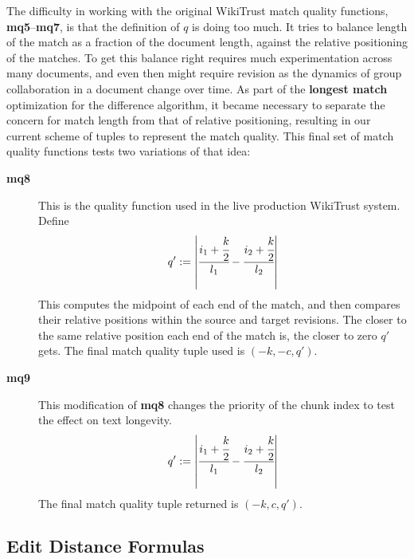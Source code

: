 The difficulty in working with the original WikiTrust
match quality functions, \textbf{mq5}--\textbf{mq7},
is that the definition of $q$ is doing too much.
It tries to balance length of the match as a fraction
of the document length, against the relative positioning
of the matches.
To get this balance right requires much experimentation across
many documents, and even then might require revision as
the dynamics of group collaboration in a document change over time.
As part of the \textbf{longest match} optimization for the
difference algorithm, it became necessary to separate the
concern for match length from that of relative positioning,
resulting in our current scheme of tuples to represent
the match quality.
This final set of match quality functions tests two variations
of that idea:
%
\begin{description}

\item[\textbf{mq8}] This is the quality function used in the
    live production WikiTrust system.
    Define
    \begin{equation*}
    q' := \left|\cfrac{ i_1 + \cfrac{k}{2} }{l_1}
            - \cfrac{ i_2 + \cfrac{k}{2} }{l_2} \right|
    \end{equation*}
    This computes the midpoint of each end of the match,
    and then compares their relative positions within
    the source and target revisions.
    The closer to the same relative position each end of
    the match is, the closer to zero $q'$ gets.
    The final match quality tuple used is $(-k, -c, q')$.

\item[\textbf{mq9}] This modification of \textbf{mq8}
    changes the priority of the chunk index to test
    the effect on text longevity.
    \begin{equation*}
    q' := \left|\cfrac{ i_1 + \cfrac{k}{2} }{l_1}
            - \cfrac{ i_2 + \cfrac{k}{2} }{l_2} \right|
    \end{equation*}
    The final match quality tuple returned is $(-k, c, q')$.

\end{description}

\subsection{Edit Distance Formulas}

